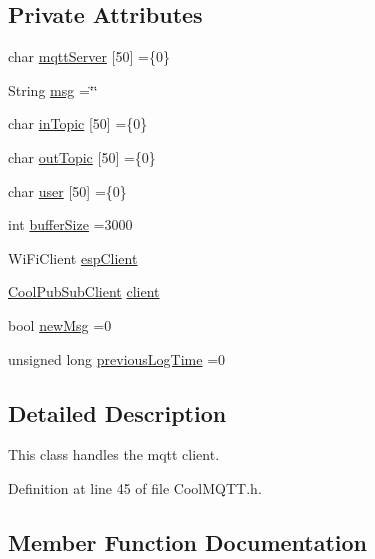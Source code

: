 \subsection*{Private Attributes}
\begin{DoxyCompactItemize}
\item 
char \hyperlink{class_cool_m_q_t_t_ab8bb951f87ddbf92db74c2ad16a3e53e}{mqtt\+Server} \mbox{[}50\mbox{]} =\{\textquotesingle{}0\textquotesingle{}\}
\item 
String \hyperlink{class_cool_m_q_t_t_af6b19e7074dbbb4ae493c44dcb53f7ff}{msg} =\char`\"{}\char`\"{}
\item 
char \hyperlink{class_cool_m_q_t_t_a4492f52a441e83cc5151010317fdb52d}{in\+Topic} \mbox{[}50\mbox{]} =\{\textquotesingle{}0\textquotesingle{}\}
\item 
char \hyperlink{class_cool_m_q_t_t_a109c786a17b463f9eeba046194279522}{out\+Topic} \mbox{[}50\mbox{]} =\{\textquotesingle{}0\textquotesingle{}\}
\item 
char \hyperlink{class_cool_m_q_t_t_a8cd47e45d457f908d4b4390b35aaee83}{user} \mbox{[}50\mbox{]} =\{\textquotesingle{}0\textquotesingle{}\}
\item 
int \hyperlink{class_cool_m_q_t_t_a7f3cf26b51d6770f216e42c5ef13ca9f}{buffer\+Size} =3000
\item 
Wi\+Fi\+Client \hyperlink{class_cool_m_q_t_t_acc30a0200967374a524092a8a806502a}{esp\+Client}
\item 
\hyperlink{class_cool_pub_sub_client}{Cool\+Pub\+Sub\+Client} \hyperlink{class_cool_m_q_t_t_afed1372683c44893b4668d0f1771f514}{client}
\item 
bool \hyperlink{class_cool_m_q_t_t_a3240388137b885775aadf38e96b24c6b}{new\+Msg} =0
\item 
unsigned long \hyperlink{class_cool_m_q_t_t_a3db37ef9ed3b05b2a8d44edba0e7d3cc}{previous\+Log\+Time} =0
\end{DoxyCompactItemize}


\subsection{Detailed Description}
This class handles the mqtt client. 

Definition at line 45 of file Cool\+M\+Q\+T\+T.\+h.



\subsection{Member Function Documentation}
\mbox{\label{class_cool_m_q_t_t_ac9248808641ebf3054ed0620ea9d0100}} 
